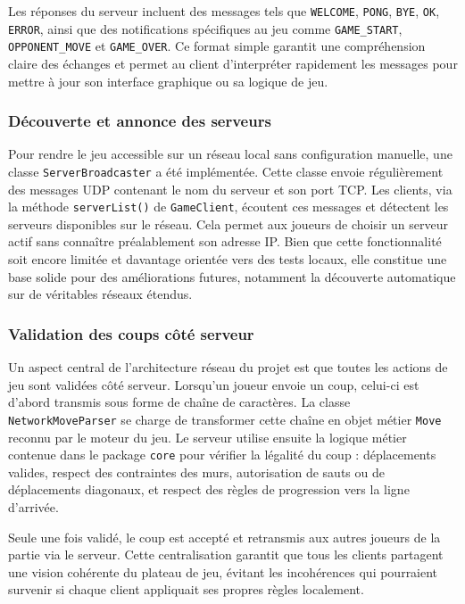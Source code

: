 \documentclass[a4paper]{article}
\begin{document}
Les réponses du serveur incluent des messages tels que \texttt{WELCOME}, \texttt{PONG}, \texttt{BYE}, \texttt{OK}, \texttt{ERROR}, ainsi que des notifications spécifiques au jeu comme \texttt{GAME\_START}, \texttt{OPPONENT\_MOVE} et \texttt{GAME\_OVER}. Ce format simple garantit une compréhension claire des échanges et permet au client d’interpréter rapidement les messages pour mettre à jour son interface graphique ou sa logique de jeu.


\subsubsection{Découverte et annonce des serveurs}


Pour rendre le jeu accessible sur un réseau local sans configuration manuelle, une classe \texttt{ServerBroadcaster} a été implémentée. Cette classe envoie régulièrement des messages UDP contenant le nom du serveur et son port TCP. Les clients, via la méthode \texttt{serverList()} de \texttt{GameClient}, écoutent ces messages et détectent les serveurs disponibles sur le réseau. Cela permet aux joueurs de choisir un serveur actif sans connaître préalablement son adresse IP. Bien que cette fonctionnalité soit encore limitée et davantage orientée vers des tests locaux, elle constitue une base solide pour des améliorations futures, notamment la découverte automatique sur de véritables réseaux étendus.


\subsubsection{Validation des coups côté serveur}


Un aspect central de l’architecture réseau du projet est que toutes les actions de jeu sont validées côté serveur. Lorsqu’un joueur envoie un coup, celui-ci est d’abord transmis sous forme de chaîne de caractères. La classe \texttt{NetworkMoveParser} se charge de transformer cette chaîne en objet métier \texttt{Move} reconnu par le moteur du jeu. Le serveur utilise ensuite la logique métier contenue dans le package \texttt{core} pour vérifier la légalité du coup : déplacements valides, respect des contraintes des murs, autorisation de sauts ou de déplacements diagonaux, et respect des règles de progression vers la ligne d’arrivée.


Seule une fois validé, le coup est accepté et retransmis aux autres joueurs de la partie via le serveur. Cette centralisation garantit que tous les clients partagent une vision cohérente du plateau de jeu, évitant les incohérences qui pourraient survenir si chaque client appliquait ses propres règles localement.
\end{document}
